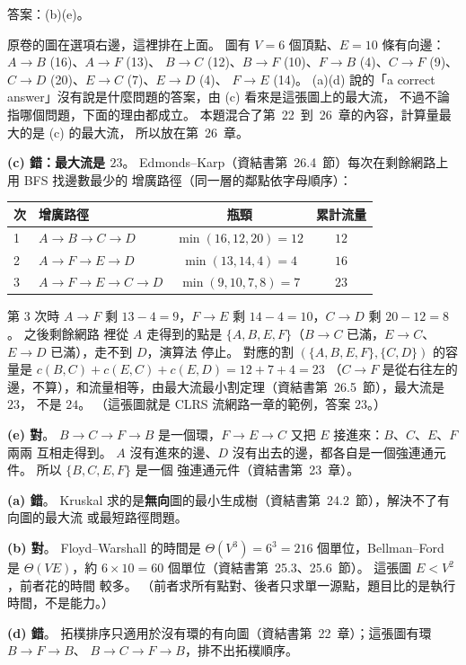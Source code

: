 \begin{pastsoln}
答案：(b)(e)。

原卷的圖在選項右邊，這裡排在上面。 圖有 $V = 6$ 個頂點、$E = 10$ 條有向邊：$A \to B$ (16)、$A \to F$ (13)、
$B \to C$ (12)、$B \to F$ (10)、$F \to B$ (4)、$C \to F$ (9)、$C \to D$ (20)、$E \to C$ (7)、$E \to D$ (4)、
$F \to E$ (14)。 (a)(d) 說的「a correct answer」沒有說是什麼問題的答案，由 (c) 看來是這張圖上的最大流，
不過不論指哪個問題，下面的理由都成立。 本題混合了第~22~到~26~章的內容，計算量最大的是 (c) 的最大流，
所以放在第~26~章。

\textbf{(c) 錯：最大流是 $23$}。 Edmonds--Karp（資結書第~26.4~節）每次在剩餘網路上用 BFS 找邊數最少的
增廣路徑（同一層的鄰點依字母順序）：
\begin{center}
\small
\begin{tabular}{llcc}
\toprule
次 & 增廣路徑 & 瓶頸 & 累計流量 \\
\midrule
1 & $A \to B \to C \to D$ & $\min(16, 12, 20) = 12$ & $12$ \\
2 & $A \to F \to E \to D$ & $\min(13, 14, 4) = 4$ & $16$ \\
3 & $A \to F \to E \to C \to D$ & $\min(9, 10, 7, 8) = 7$ & $23$ \\
\bottomrule
\end{tabular}
\end{center}
第 $3$ 次時 $A \to F$ 剩 $13 - 4 = 9$，$F \to E$ 剩 $14 - 4 = 10$，$C \to D$ 剩 $20 - 12 = 8$。 之後剩餘網路
裡從 $A$ 走得到的點是 $\{A, B, E, F\}$（$B \to C$ 已滿，$E \to C$、$E \to D$ 已滿），走不到 $D$，演算法
停止。 對應的割 $(\{A, B, E, F\}, \{C, D\})$ 的容量是 $c(B, C) + c(E, C) + c(E, D) = 12 + 7 + 4 = 23$
（$C \to F$ 是從右往左的邊，不算），和流量相等，由最大流最小割定理（資結書第~26.5~節），最大流是 $23$，
不是 $24$。 （這張圖就是 CLRS 流網路一章的範例，答案 $23$。）

\textbf{(e) 對}。 $B \to C \to F \to B$ 是一個環，$F \to E \to C$ 又把 $E$ 接進來：$B$、$C$、$E$、$F$ 兩兩
互相走得到。 $A$ 沒有進來的邊、$D$ 沒有出去的邊，都各自是一個強連通元件。 所以 $\{B, C, E, F\}$ 是一個
強連通元件（資結書第~23~章）。

\textbf{(a) 錯}。 Kruskal 求的是\textbf{無向}圖的最小生成樹（資結書第~24.2~節），解決不了有向圖的最大流
或最短路徑問題。

\textbf{(b) 對}。 Floyd--Warshall 的時間是 $\Theta(V^3) = 6^3 = 216$ 個單位，Bellman--Ford 是
$\Theta(VE)$，約 $6 \times 10 = 60$ 個單位（資結書第~25.3、25.6~節）。 這張圖 $E < V^2$，前者花的時間
較多。 （前者求所有點對、後者只求單一源點，題目比的是執行時間，不是能力。）

\textbf{(d) 錯}。 拓樸排序只適用於沒有環的有向圖（資結書第~22~章）；這張圖有環 $B \to F \to B$、
$B \to C \to F \to B$，排不出拓樸順序。
\end{pastsoln}

